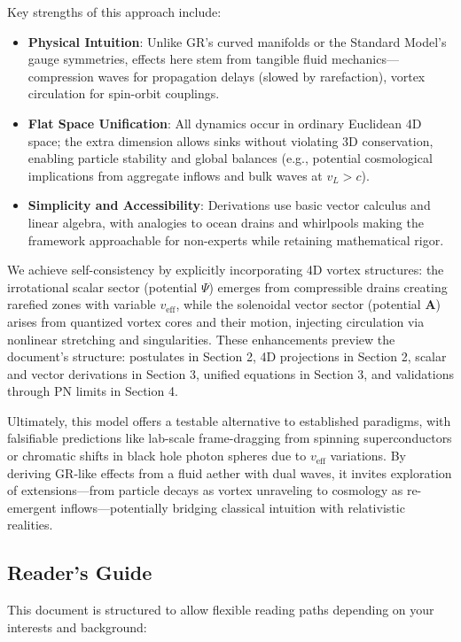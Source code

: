 \documentclass{article}
\begin{document}
Key strengths of this approach include:
\begin{itemize}
    \item \textbf{Physical Intuition}: Unlike GR's curved manifolds or the Standard Model's gauge symmetries, effects here stem from tangible fluid mechanics---compression waves for propagation delays (slowed by rarefaction), vortex circulation for spin-orbit couplings.
    \item \textbf{Flat Space Unification}: All dynamics occur in ordinary Euclidean 4D space; the extra dimension allows sinks without violating 3D conservation, enabling particle stability and global balances (e.g., potential cosmological implications from aggregate inflows and bulk waves at $v_L > c$).
    \item \textbf{Simplicity and Accessibility}: Derivations use basic vector calculus and linear algebra, with analogies to ocean drains and whirlpools making the framework approachable for non-experts while retaining mathematical rigor.
\end{itemize}

We achieve self-consistency by explicitly incorporating 4D vortex structures: the irrotational scalar sector (potential $\Psi$) emerges from compressible drains creating rarefied zones with variable $v_{\text{eff}}$, while the solenoidal vector sector (potential $\mathbf{A}$) arises from quantized vortex cores and their motion, injecting circulation via nonlinear stretching and singularities. These enhancements preview the document's structure: postulates in Section 2, 4D projections in Section 2, scalar and vector derivations in Section 3, unified equations in Section 3, and validations through PN limits in Section 4.

Ultimately, this model offers a testable alternative to established paradigms, with falsifiable predictions like lab-scale frame-dragging from spinning superconductors or chromatic shifts in black hole photon spheres due to $v_{\text{eff}}$ variations. By deriving GR-like effects from a fluid aether with dual waves, it invites exploration of extensions---from particle decays as vortex unraveling to cosmology as re-emergent inflows---potentially bridging classical intuition with relativistic realities.

\subsection{Reader's Guide}

This document is structured to allow flexible reading paths depending on your interests and background:
\end{document}
